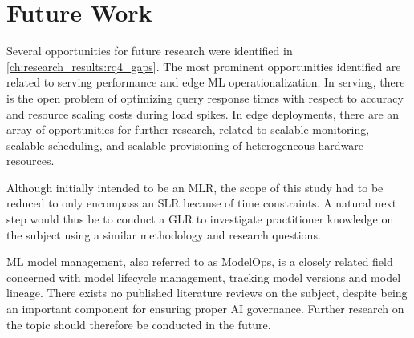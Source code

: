 \chapter{Future Work}
\label{ch:future_work}
Several opportunities for future research were identified in \cref{ch:research_results:rq4_gaps}.
The most prominent opportunities identified are related to serving performance and edge ML operationalization.
In serving, there is the open problem of optimizing query response times with respect to accuracy and resource scaling costs during load spikes.
In edge deployments, there are an array of opportunities for further research, related to scalable monitoring, scalable scheduling, and scalable provisioning of heterogeneous hardware resources.

Although initially intended to be an MLR, the scope of this study had to be reduced to only encompass an SLR because of time constraints.
A natural next step would thus be to conduct a GLR to investigate practitioner knowledge on the subject using a similar methodology and research questions.

ML model management, also referred to as ModelOps, is a closely related field concerned with model lifecycle management, tracking model versions and model lineage.
There exists no published literature reviews on the subject, despite being an important component for ensuring proper AI governance.
Further research on the topic should therefore be conducted in the future.